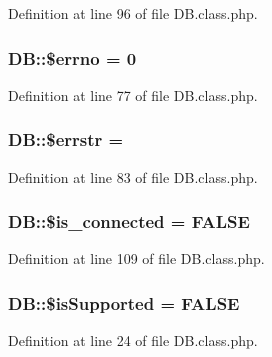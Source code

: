 Definition at line 96 of file D\+B.\+class.\+php.

\hypertarget{classDB_af99d759f7fb3bbadd579d72e686d1cf1}{}
\subsubsection[{\$errno}]{\setlength{\rightskip}{0pt plus 5cm}D\+B\+::\$errno = 0}\label{classDB_af99d759f7fb3bbadd579d72e686d1cf1}


Definition at line 77 of file D\+B.\+class.\+php.

\hypertarget{classDB_ae006f35821aba99713b834fa6a69e55b}{}
\subsubsection[{\$errstr}]{\setlength{\rightskip}{0pt plus 5cm}D\+B\+::\$errstr = \textquotesingle{}\textquotesingle{}}\label{classDB_ae006f35821aba99713b834fa6a69e55b}


Definition at line 83 of file D\+B.\+class.\+php.

\hypertarget{classDB_aac22b6ebcd8f78c2f70646d381f933dc}{}
\subsubsection[{\$is\+\_\+connected}]{\setlength{\rightskip}{0pt plus 5cm}D\+B\+::\$is\+\_\+connected = F\+A\+L\+S\+E}\label{classDB_aac22b6ebcd8f78c2f70646d381f933dc}


Definition at line 109 of file D\+B.\+class.\+php.

\hypertarget{classDB_a6b693edbdcdce5c86f42c050f62d8136}{}
\subsubsection[{\$is\+Supported}]{\setlength{\rightskip}{0pt plus 5cm}D\+B\+::\$is\+Supported = F\+A\+L\+S\+E\hspace{0.3cm}{\ttfamily [static]}}\label{classDB_a6b693edbdcdce5c86f42c050f62d8136}


Definition at line 24 of file D\+B.\+class.\+php.

\hypertarget{classDB_ad0a3ae175a659516131cfc6cd615d15c}{}
